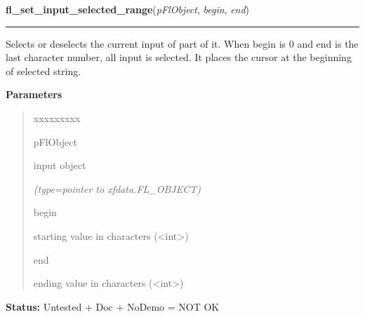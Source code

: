 \hspace{.8\funcindent}\begin{boxedminipage}{\funcwidth}

    \raggedright \textbf{fl\_set\_input\_selected\_range}(\textit{pFlObject}, \textit{begin}, \textit{end})

    \vspace{-1.5ex}

    \rule{\textwidth}{0.5\fboxrule}
\setlength{\parskip}{2ex}
    Selects or deselects the current input of part of it. When begin is 0 
    and end is the last character number, all input is selected. It places 
    the cursor at the beginning of selected string.

\setlength{\parskip}{1ex}
      \textbf{Parameters}
      \vspace{-1ex}

      \begin{quote}
        \begin{Ventry}{xxxxxxxxx}

          \item[pFlObject]

          input object

            {\it (type=pointer to xfdata.FL\_OBJECT)}

          \item[begin]

          starting value in characters ({\textless}int{\textgreater})

          \item[end]

          ending value in characters ({\textless}int{\textgreater})

        \end{Ventry}

      \end{quote}

\textbf{Status:} Untested + Doc + NoDemo = NOT OK



    \end{boxedminipage}

    \label{xformslib:flinput:fl_get_input_selected_range}

    \vspace{0.5ex}

